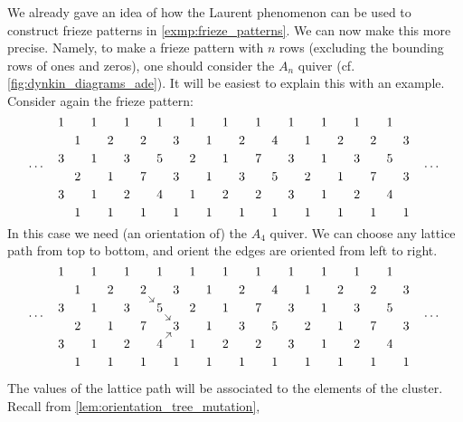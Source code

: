 \begin{example}

	We already gave an idea of how the Laurent phenomenon can be used to construct frieze
	patterns in \cref{exmp:frieze_patterns}. We can now make this
	more precise. Namely, to make a frieze pattern with $n$ rows (excluding the bounding
	rows of ones and zeros), one should consider the $A_n$ quiver (cf.
	\cref{fig:dynkin_diagrams_ade}). It will be easiest to explain this with an example.
	Consider again the frieze pattern:
	\begin{equation*}
		\dots\quad
		\begin{tikzcd}[
				sep = 0.2em, cramped,
			]
			1&&1&&1&&1&&1&&1&&1&&1&&1&&1&&1\\
			&1&&2&&2&&3&&1&&2&&4&&1&&2&&2&&3\\
			3&&1&&3&&5&&2&&1&&7&&3&&1&&3&&5\\
			&2&&1&&7&&3&&1&&3&&5&&2&&1&&7&&3\\
			3&&1&&2&&4&&1&&2&&2&&3&&1&&2&&4\\
			&1&&1&&1&&1&&1&&1&&1&&1&&1&&1&&1
		\end{tikzcd}
		\quad
		\dots
	\end{equation*}
	In this case we need (an orientation of) the $A_4$ quiver. We can choose any lattice
	path from top to bottom, and orient the edges are oriented from left to right.
	\begin{equation*}
		\dots\quad
		\begin{tikzcd}[
				sep = 0.2em, cramped,
			]
			1&&1&&1&&1&&1&&1&&1&&1&&1&&1&&1\\
			&1&&2&&2\drar[shorten=-0.15em] &&3&&1&&2&&4&&1&&2&&2&&3\\
			3&&1&&3&&5 \drar[shorten=-0.15em] &&2&&1&&7&&3&&1&&3&&5\\
			&2&&1&&7&&3&&1&&3&&5&&2&&1&&7&&3\\
			3&&1&&2&&4\urar[shorten=-0.15em] &&1&&2&&2&&3&&1&&2&&4\\
			&1&&1&&1&&1&&1&&1&&1&&1&&1&&1&&1
		\end{tikzcd}
		\quad
		\dots
	\end{equation*}

	The values of the lattice path will be associated to the elements of the cluster.
	Recall from \cref{lem:orientation_tree_mutation},


\end{example}
